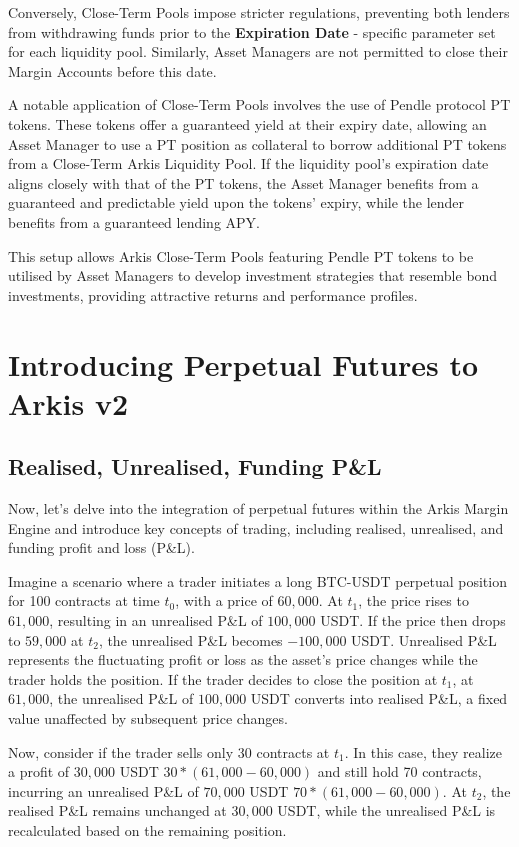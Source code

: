 \documentclass[conference]{IEEEtran}
\begin{document}
Conversely, Close-Term Pools impose stricter regulations, preventing both lenders from withdrawing funds prior to the \textbf{Expiration Date} - specific parameter set for each liquidity pool. Similarly, Asset Managers are not permitted to close their Margin Accounts before this date.

A notable application of Close-Term Pools involves the use of Pendle protocol PT tokens. These tokens offer a guaranteed yield at their expiry date, allowing an Asset Manager to use a PT position as collateral to borrow additional PT tokens from a Close-Term Arkis Liquidity Pool. If the liquidity pool’s expiration date aligns closely with that of the PT tokens, the Asset Manager benefits from a guaranteed and predictable yield upon the tokens' expiry, while the lender benefits from a guaranteed lending APY.

This setup allows Arkis Close-Term Pools featuring Pendle PT tokens to be utilised by Asset Managers to develop investment strategies that resemble bond investments, providing attractive returns and performance profiles.

\section{Introducing Perpetual Futures to Arkis v2}
\subsection{Realised, Unrealised, Funding P\&L}
Now, let’s delve into the integration of perpetual futures within the Arkis Margin Engine and introduce key concepts of trading, including realised, unrealised, and funding profit and loss (P\&L).

Imagine a scenario where a trader initiates a long BTC-USDT perpetual position for 100 contracts at time $t_{0}$, with a price of $60,000$. At $t_{1}$, the price rises to $61,000$, resulting in an unrealised P\&L of $100,000$ USDT. If the price then drops to $59,000$ at $t_{2}$, the unrealised P\&L becomes $-100,000$ USDT. Unrealised P\&L represents the fluctuating profit or loss as the asset's price changes while the trader holds the position. If the trader decides to close the position at $t_{1}$, at $61,000$, the unrealised P\&L of $100,000$ USDT converts into realised P\&L, a fixed value unaffected by subsequent price changes.

Now, consider if the trader sells only 30 contracts at $t_{1}$. In this case, they realize a profit of $30,000$ USDT $30 * (61,000 - 60,000)$ and still hold 70 contracts, incurring an unrealised P\&L of $70,000$ USDT $70 * (61,000 - 60,000)$. At $t_{2}$, the realised P\&L remains unchanged at $30,000$ USDT, while the unrealised P\&L is recalculated based on the remaining position.
\end{document}
